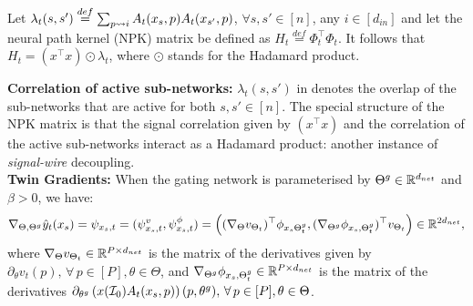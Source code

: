 \begin{lemma}\label{lm:npk}
Let $\lambda_t(s,s')\stackrel{def}{=}\sum_{p\rightsquigarrow i} A_t(x_s,p) A_t(x_{s'},p)$, $\forall s,s'\in[n]$, any $i\in [d_{in}]$ and let the {neural path kernel} (NPK) matrix be defined as $H_t\stackrel{def}=\Phi^\top_t\Phi_t$. It follows that $H_t= (x^\top x)\odot\lambda_t$, where $\odot$ stands for the Hadamard product.
\end{lemma}
\textbf{Correlation of active sub-networks:} $\lambda_t(s,s')$ in  denotes the overlap of the sub-networks that are active for both $s,s'\in[n]$. The special structure of the NPK matrix is that the signal correlation given by $(x^\top x)$ and the correlation of the active sub-networks interact as a Hadamard product: another instance of \emph{signal-wire} decoupling.\\
\textbf{Twin Gradients:} When the gating network is parameterised by ${\Theta}^g\in\mathbb{R}^{d_{net}}$ and $\beta>0$, we have:
\begin{align}\label{eq:twin}\nabla_{\Theta,{\Theta}^g}\hat{y}_t(x_s)=\psi_{x_s,t}=(\psi^v_{x_s,t}, \psi^{\phi}_{x_s,t})=\left((\nabla_{\Theta}v_{\Theta_t})^\top \phi_{x_s{\Theta}^g_t}, (\nabla_{{\Theta}^g}\phi_{x_s,{\Theta}^g_t})^\top v_{\Theta_t}\right)\in \mathbb{R}^{2d_{net}},
\end{align}
where  $\nabla_{\Theta}v_{\Theta_t}\in \mathbb{R}^{P\times d_{net}}$ is the matrix of the derivatives given by $\partial_{\theta}v_t(p),\,\forall\,p\in[P],\theta\in\Theta$, and  $\nabla_{{\Theta}^g}\phi_{x_s,{\Theta}^g_t}\in \mathbb{R}^{P\times d_{net}}$ is the matrix of the derivatives $\partial_{\theta^g}\left(x(\mathcal{I}_0)A_t(x_s,p)\right)(p,\theta^g), \,\forall\,p\in[P],\theta\in\Theta$.\\
